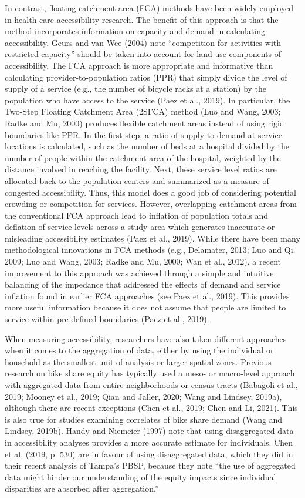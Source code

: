 \documentclass[]{elsarticle} %
\begin{document}
In contrast, floating catchment area (FCA) methods have been widely
employed in health care accessibility research. The benefit of this
approach is that the method incorporates information on capacity and
demand in calculating accessibility. Geurs and van Wee (2004) note
``competition for activities with restricted capacity'' should be taken
into account for land-use components of accessibility. The FCA approach
is more appropriate and informative than calculating
provider-to-population ratios (PPR) that simply divide the level of
supply of a service (e.g., the number of bicycle racks at a station) by
the population who have access to the service (Paez et al., 2019). In
particular, the Two-Step Floating Catchment Area (2SFCA) method (Luo and
Wang, 2003; Radke and Mu, 2000) produces flexible catchment areas
instead of using rigid boundaries like PPR. In the first step, a ratio
of supply to demand at service locations is calculated, such as the
number of beds at a hospital divided by the number of people within the
catchment area of the hospital, weighted by the distance involved in
reaching the facility. Next, these service level ratios are allocated
back to the population centers and summarized as a measure of congested
accessibility. Thus, this model does a good job of considering potential
crowding or competition for services. However, overlapping catchment
areas from the conventional FCA approach lead to inflation of population
totals and deflation of service levels across a study area which
generates inaccurate or misleading accessibility estimates (Paez et al.,
2019). While there have been many methodological innovations in FCA
methods (e.g., Delamater, 2013; Luo and Qi, 2009; Luo and Wang, 2003;
Radke and Mu, 2000; Wan et al., 2012), a recent improvement to this
approach was achieved through a simple and intuitive balancing of the
impedance that addressed the effects of demand and service inflation
found in earlier FCA approaches (see Paez et al., 2019). This provides
more useful information because it does not assume that people are
limited to service within pre-defined boundaries (Paez et al., 2019).

When measuring accessibility, researchers have also taken different
approaches when it comes to the aggregation of data, either by using the
individual or household as the smallest unit of analysis or larger
spatial zones. Previous research on bike share equity has typically used
a meso- or macro-level approach with aggregated data from entire
neighborhoods or census tracts (Babagoli et al., 2019; Mooney et al.,
2019; Qian and Jaller, 2020; Wang and Lindsey, 2019a), although there
are recent exceptions (Chen et al., 2019; Chen and Li, 2021). This is
also true for studies examining correlates of bike share demand (Wang
and Lindsey, 2019b). Handy and Niemeier (1997) note that using
disaggregated data in accessibility analyses provides a more accurate
estimate for individuals. Chen et al. (2019, p. 530) are in favour of
using disaggregated data, which they did in their recent analysis of
Tampa's PBSP, because they note ``the use of aggregated data might
hinder our understanding of the equity impacts since individual
disparities are absorbed after aggregation.''
\end{document}
